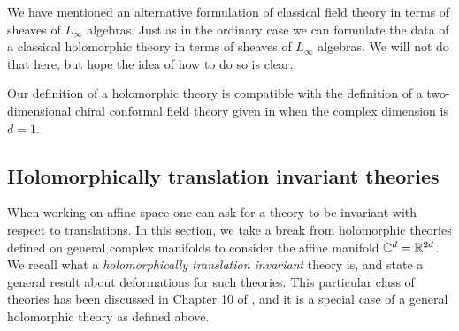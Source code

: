 \documentclass[10pt]{amsart}
\begin{document}
%

\begin{rmk}
We have mentioned an alternative formulation of classical field theory in terms of sheaves of $L_\infty$ algebras.
Just as in the ordinary case we can formulate the data of a classical holomorphic theory in terms of sheaves of $L_\infty$ algebras. 
We will not do that here, but hope the idea of how to do so is clear.
\end{rmk}

\begin{rmk}
Our definition of a holomorphic theory is compatible with the definition of a two-dimensional chiral conformal field theory given in \cite{LiVertex} when the complex dimension is $d=1$.
\end{rmk}

\subsection{Holomorphically translation invariant theories} \label{sec: hol trans}

When working on affine space one can ask for a theory to be invariant with respect to translations. 
In this section, we take a break from holomorphic theories defined on general complex manifolds to consider the affine manifold $\mathbb C^d = \mathbb R^{2d}$.
We recall what a {\em holomorphically translation invariant} theory is, and state a general result about deformations for such theories. 
This particular class of theories has been discussed in Chapter 10 of \cite{CG2}, and it is a special case of a general holomorphic theory as defined above.  
\end{document}
